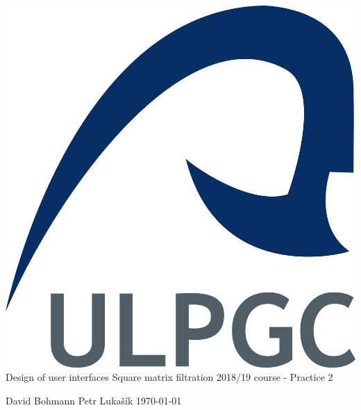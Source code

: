 \documentclass[12pt]{report}
\begin{document}
%
%
\begin{center}
\includegraphics[scale=0.2]{img/ulpgc_logo.jpg}
\vspace{5cm}\linebreak
\Huge{Design of user interfaces}\linebreak
\large{Square matrix filtration}\linebreak
\normalsize{2018/19 course - Practice 2}\linebreak
\vspace{3cm}\linebreak

\small{David Bohmann}\linebreak
\small{Petr Lukašík}\linebreak
\today\linebreak
\end{center}
%
%

%
%
\newpage
{\footnotesize \tableofcontents}

%
%
\end{document}
